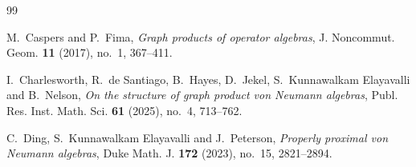 \documentclass[12pt]{article}
\theoremstyle{definition}
\begin{document}
\begin{thebibliography}{99}

M.~Caspers and P.~Fima,
\emph{Graph products of operator algebras},
J. Noncommut. Geom. \textbf{11} (2017), no.~1, 367--411.

I.~Charlesworth, R.~de Santiago, B.~Hayes, D.~Jekel,
S.~Kunnawalkam Elayavalli and B.~Nelson,
\emph{On the structure of graph product von Neumann algebras},
Publ. Res. Inst. Math. Sci. \textbf{61} (2025), no.~4, 713--762.

C.~Ding, S.~Kunnawalkam Elayavalli and J.~Peterson,
\emph{Properly proximal von Neumann algebras},
Duke Math. J. \textbf{172} (2023), no.~15, 2821--2894.

\end{thebibliography}
\end{document}
